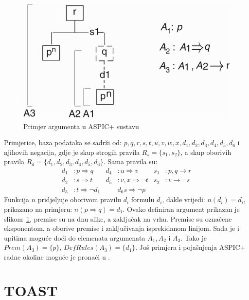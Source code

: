 \begin{figure}
    \includegraphics[scale=0.6]{aspic.jpg}
    \caption{Primjer argumenta u ASPIC+ sustavu}
\label{fig:aspic}
\end{figure}

Primjerice, baza podataka se sadrži od:
$p, q, r, s, t, u, v, w, x, d_1, d_2, d_3, d_4, d_5, d_6$ i njihovih negacija, gdje 
je skup strogih pravila $R_s = \{s_1, s_2\}$, a skup oborivih pravila
$R_d = \{d_1, d_2, d_3, d_4, d_5, d_6\}$. Sama pravila su:
\begin{align*}
    d_1&: p \Rightarrow q  &   d_4&: u \Rightarrow v   &    s_1&: p, q \rightarrow r \\
    d_2&: s \Rightarrow t  &   d_5&: v, x \Rightarrow \neg t  &    s_2&: v \rightarrow \neg s \\
    d_3&: t \Rightarrow \neg d_1  &  & d_6 s \Rightarrow \neg p
\end{align*}
Funkcija $n$ pridjeljuje oborivom pravilu $d_i$ formulu $d_i$, dakle vrijedi:
$n(d_i) = d_i$, prikazano na primjeru: $n(p \Rightarrow q) = d_1$. Ovako definiran argument
prikazan je slikom~\ref{fig:aspic}, premise su na dnu slike, a zaključak na vrhu. Premise
su označene eksponentom, a oborive premise i zaključivanja isprekidanom linijom. 
Sada je i upitima moguće doći do elemenata argumenata $A_1, A_2$ i $A_3$. Tako je
$Prem(A_3) = \{p\}$, $DefRules(A_3) = \{d_1\}$. Još primjera i pojašnjenja ASPIC+
radne okoline moguće je pronaći u \citep{modgil2014aspic+}. 

\section{TOAST}

